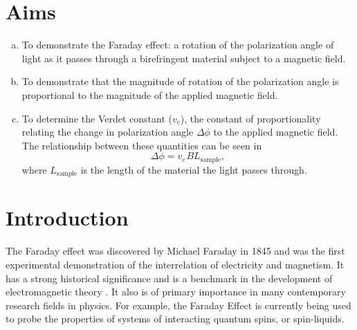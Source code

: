 \documentclass[prb,preprint]{revtex4-1}
\begin{document}
\maketitle 
\section{Aims}
{
\begin{enumerate}[(a)]
\item To demonstrate the Faraday effect: a rotation of the polarization angle of light as it passes through a birefringent material subject to a magnetic field.

\item To demonstrate that the magnitude of rotation of the polarization angle is proportional to the magnitude of the applied magnetic field.

\item{To determine the Verdet constant ($v_{c}$), the constant of proportionality relating the change in polarization angle $\Delta \phi$ to the applied magnetic field. The relationship between these quantities can be seen in
\begin{equation}
\label{vconst}
\Delta \phi =v_{c} \hspace{1pt}B L{_{\textrm{sample}}},
\end{equation}
where $L_{\textrm{sample}}$ is the length of the material the light passes through.}
\end{enumerate}

}
\section{Introduction} 

The Faraday effect was discovered by Michael Faraday in 1845 and was the first experimental demonstration of the interrelation of electricity and magnetism.  It has a strong historical significance and is a benchmark in the development of electromagnetic theory \cite{melissinos}.  It also is of primary importance in many contemporary research fields in physics.  For example, the Faraday Effect is currently being used to probe the properties of systems of interacting quantum spins, or spin-liquids.\cite{spin}
\end{document}

